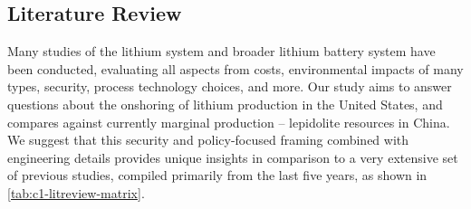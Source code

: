 \label{app:04}

\subsection{Literature Review}\label{app:04-litreview}

Many studies of the lithium system and broader lithium battery system have been conducted, evaluating all aspects from costs, environmental impacts of many types, security, process technology choices, and more. Our study aims to answer questions about the onshoring of lithium production in the United States, and compares against currently marginal production -- lepidolite resources in China. We suggest that this security and policy-focused framing combined with engineering details provides unique insights in comparison to a very extensive set of previous studies, compiled primarily from the last five years, as shown in \ref{tab:c1-litreview-matrix}. 

